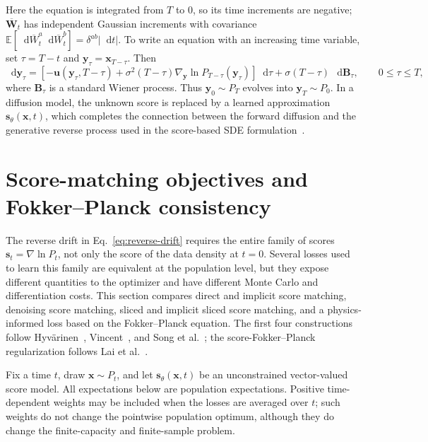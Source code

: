 \documentclass[11pt]{article}
\newcommand{\vct}[1]{\bm{#1}}
\newcommand{\dd}{\mathop{}\!\mathrm{d}}
\begin{document}
Here the equation is integrated from \(T\) to \(0\), so its time increments are
negative; \(\overline{\vct{W}}_t\) has independent Gaussian increments with
covariance \(\mathbb{E}[\dd\overline{W}_t^a\dd\overline{W}_t^b]
=\delta^{ab}|\dd t|\). To write an equation with an increasing time variable,
set \(\tau=T-t\) and \(\vct{y}_\tau=\vct{x}_{T-\tau}\). Then
\begin{equation}
    \dd\vct{y}_\tau
    =\left[-\vct{u}(\vct{y}_\tau,T-\tau)
    +\sigma^2(T-\tau)\nabla_{\vct{y}}
      \ln P_{T-\tau}(\vct{y}_\tau)\right]\dd\tau
    +\sigma(T-\tau)\,\dd\vct{B}_\tau,
    \qquad 0\leq\tau\leq T,
    \label{eq:reverse-sde-increasing-time}
\end{equation}
where \(\vct{B}_\tau\) is a standard Wiener process. Thus
\(\vct{y}_0\sim P_T\) evolves into \(\vct{y}_T\sim P_0\). In a diffusion model,
the unknown score is replaced by a learned approximation
\(\vct{s}_{\theta}(\vct{x},t)\), which completes the connection between the
forward diffusion and the generative reverse process used in the score-based SDE
formulation~\cite{song2021scorebased}.

\section{Score-matching objectives and Fokker--Planck consistency}

The reverse drift in Eq.~\eqref{eq:reverse-drift} requires the entire family of
scores \(\vct{s}_t=\nabla\ln P_t\), not only the score of the data density at
\(t=0\). Several losses used to learn this family are equivalent at the
population level, but they expose different quantities to the optimizer and
have different Monte Carlo and differentiation costs. This section compares
direct and implicit score matching, denoising score matching, sliced and
implicit sliced score matching, and a physics-informed loss based on the
Fokker--Planck equation. The first four constructions follow
Hyv\"arinen~\cite{hyvarinen2005}, Vincent~\cite{vincent2011}, and
Song et al.~\cite{song2020}; the score-Fokker--Planck regularization follows
Lai et al.~\cite{lai2023}.

Fix a time \(t\), draw \(\vct{x}\sim P_t\), and let
\(\vct{s}_{\theta}(\vct{x},t)\) be an unconstrained vector-valued score model.
All expectations below are population expectations. Positive time-dependent
weights may be included when the losses are averaged over \(t\); such weights
do not change the pointwise population optimum, although they do change the
finite-capacity and finite-sample problem.
\end{document}
